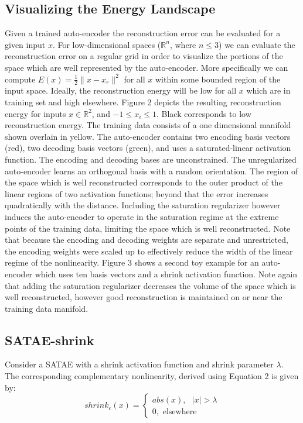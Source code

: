 \documentclass{article} %
\begin{document}
\subsection{Visualizing the Energy Landscape}  
Given a trained auto-encoder the reconstruction error can be evaluated for a given input $x$. For low-dimensional spaces ($\mathbb{R}^n$, where $n \leq 3$) we can evaluate the reconstruction error on a regular grid in order to visualize the portions of the space which are well represented by the auto-encoder. More specifically we can compute $E(x) = \frac{1}{2} \|x - x_r \|^2$ for all $x$ within some bounded region of the input space. Ideally, the reconstruction energy will be low for all $x$ which are in training set and high elsewhere. Figure 2 depicts the resulting reconstruction energy for inputs $x \in \mathbb{R}^2$, and  $-1 \leq x_i \leq 1$. Black corresponds to low reconstruction energy. The training data consists of a one dimensional manifold shown overlain in yellow. The auto-encoder contains two encoding basis vectors (red), two decoding basis vectors (green), and uses a saturated-linear activation function. The encoding and decoding bases are unconstrained. The unregularized auto-encoder learns an orthogonal basis with a random orientation. The region of the space which is well reconstructed corresponds to the outer product of the linear regions of two activation functions; beyond that the error increases quadratically with the distance. Including the saturation regularizer however induces the auto-encoder to operate in the saturation regime at the extreme points of the training data, limiting the space which is well reconstructed. Note that because the encoding and decoding weights are separate and unrestricted, the encoding weights were scaled up to effectively reduce the width of the linear regime of the nonlinearity. Figure 3 shows a second toy example for an auto-encoder which uses ten basis vectors and a shrink activation function. Note again that adding the saturation regularizer decreases the volume of the space which is well reconstructed, however good reconstruction is maintained on or near the training data manifold. 

\subsection{SATAE-shrink}
Consider a SATAE with a shrink activation function and shrink parameter $\lambda$. The corresponding complementary nonlinearity, derived using Equation 2 is given by: 
\begin{equation} 
\nonumber
shrink_c(x) =
\begin{cases}
abs(x), \text{ } |x| > \lambda\\
0, \text{ elsewhere}
\end{cases}
\end{equation} 
\end{document}
